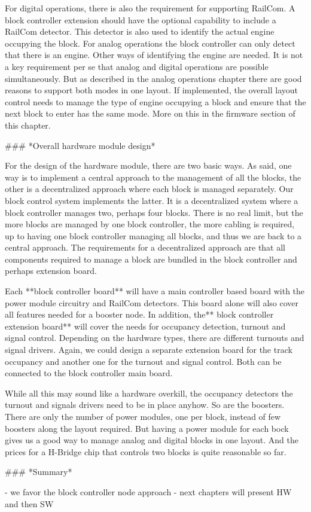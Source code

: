 For digital operations, there is also the requirement for supporting RailCom. A block controller extension should have the optional capability to include a RailCom detector. This detector is also used to identify the actual engine occupying the block. For analog operations the block controller can only detect that there is an engine. Other ways of identifying the engine are needed. It is not a key requirement per se that analog and digital operations are possible simultaneously. But as described in the analog operations chapter there are good reasons to support both modes in one layout. If implemented, the overall layout control needs to manage the type of engine occupying a block and ensure that the next block to enter has the same mode. More on this in the firmware section of this chapter.

### *Overall hardware module design*

For the design of the hardware module, there are two basic ways. As said, one way is to implement a central approach to the management of all the blocks, the other is a decentralized approach where each block is managed separately. Our block control system implements the latter. It is a decentralized system where a block controller manages two, perhaps four blocks. There is no real limit, but the more blocks are managed by one block controller, the more cabling is required, up to having one block controller managing all blocks, and thus we are back to a central approach. The requirements for a decentralized approach are that all components required to manage a block are bundled in the block controller and perhaps extension board.

Each **block controller board** will have a main controller based board with the power module circuitry and RailCom detectors. This board alone will also cover all features needed for a booster node. In addition, the** block controller extension board** will cover the needs for occupancy detection, turnout and signal control. Depending on the hardware types, there are different turnouts and signal drivers. Again, we could design a separate extension board for the track occupancy and another one for the turnout and signal control. Both can be connected to the block controller main board.

While all this may sound like a hardware overkill, the occupancy detectors the turnout and signals drivers need to be in place anyhow. So are the boosters. There are only the number of power modules, one per block, instead of few boosters along the layout required. But having a power module for each bock gives us a good way to manage analog and digital blocks in one layout. And the prices for a H-Bridge chip that controls two blocks is quite reasonable so far.

### *Summary*

- we favor the block controller node approach
- next chapters will present HW and then SW